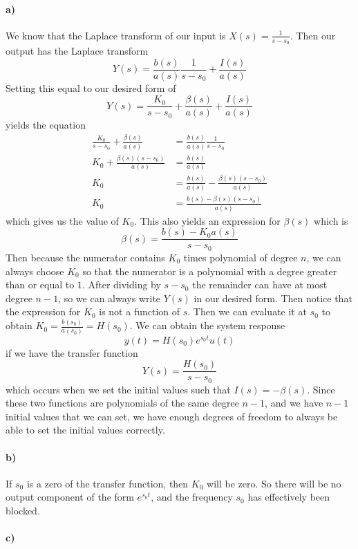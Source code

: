 \documentclass[12pt]{article}
\begin{document}
\paragraph{a)}

We know that the Laplace transform of our input is \(X(s)=\frac{1}{s-s_0}\). Then our output has the
Laplace transform
\[Y(s)=\frac{b(s)}{a(s)}\frac{1}{s-s_0} + \frac{I(s)}{a(s)}\]
Setting this equal to our desired form of
\[Y(s)=\frac{K_0}{s-s_0}+\frac{\beta(s)}{a(s)}+\frac{I(s)}{a(s)}\]
yields the equation
\begin{align*}
    \frac{K_0}{s-s_0}+\frac{\beta(s)}{a(s)}&=\frac{b(s)}{a(s)}\frac{1}{s-s_0}\\
    K_0+\frac{\beta(s)(s-s_0)}{a(s)}&=\frac{b(s)}{a(s)}\\
    K_0&=\frac{b(s)}{a(s)}-\frac{\beta(s)(s-s_0)}{a(s)}\\
    K_0&=\frac{b(s)-\beta(s)(s-s_0)}{a(s)}
\end{align*}
which gives us the value of \(K_0\). This also yields an expression for \(\beta(s)\) which is
\[\beta(s)=\frac{b(s)-K_0a(s)}{s-s_0}\]
Then because the numerator contains \(K_0\) times polynomial of degree \(n\), we can always choose
\(K_0\) so that the numerator is a polynomial with a degree greater than or equal to \(1\). After
dividing by \(s-s_0\) the remainder can have at most degree \(n-1\), so we can always write \(Y(s)\)
in our desired form. Then notice that the expression for \(K_0\) is not a function of \(s\). Then we
can evaluate it at \(s_0\) to obtain \(K_0=\frac{b(s_0)}{a(s_0)}=H(s_0)\). We can obtain the system response
\[y(t)=H(s_0)e^{s_0t}u(t)\]
if we have the transfer function
\[Y(s)=\frac{H(s_0)}{s-s_0}\]
which occurs when we set the initial values such that \(I(s)=-\beta(s)\). Since these two functions are
polynomials of the same degree \(n-1\), and we have \(n-1\) initial values that we can set, we have enough
degrees of freedom to always be able to set the initial values correctly.

\paragraph{b)}

If \(s_0\) is a zero of the transfer function, then \(K_0\) will be zero. So there will be no output component
of the form \(e^{s_0t}\), and the frequency \(s_0\) has effectively been blocked.

\paragraph{c)}
\end{document}

